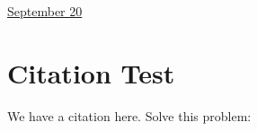 \documentclass[11pt,letterpaper]{article}
\begin{document}
\href{run:2025-09-20-newmethod.tex}{\Huge September 20} 

\section{Citation Test}


We have a citation \cite{research_methods2024} here.  Solve this problem: 


 

\end{document}
